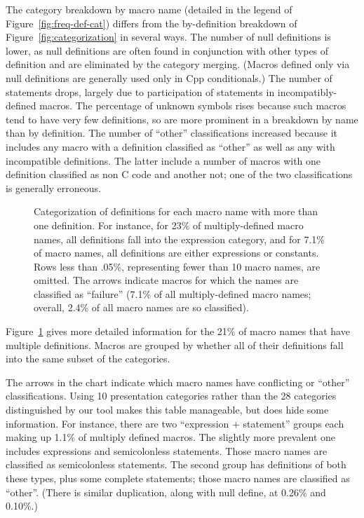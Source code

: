 \documentclass[10pt]{article}
\newcommand{\captionsmall}[1]{\caption[]{\small #1}}
\begin{document}
The category breakdown by macro name (detailed in the legend of
Figure~\ref{fig:freq-def-cat}) differs from the by-definition breakdown of
Figure~\ref{fig:categorization} in several ways.  The number of null
definitions is lower, as null definitions are often found in conjunction
with other types of definition and are eliminated by the category merging.
(Macros defined only via null definitions are generally used only in Cpp
conditionals.)  The number of statements drops, largely due to
participation of statements in incompatibly-defined macros.  The percentage
of unknown symbols rises because such macros tend to have very few
definitions, so are more prominent in a breakdown by name than by
definition.  The number of ``other'' classifications increased because it
includes any macro with a definition classified as ``other'' as well as any
with incompatible definitions.  The latter include a number of macros with
one definition classified as non C code and another not; one of the two
classifications is generally erroneous.


\begin{figure}
  {\small\centerline{}}
  
  \captionsmall{Categorization of definitions for each macro name with more
    than one definition.  For instance, for 23\% of multiply-defined macro
    names, all definitions fall into the expression category, and for 7.1\%
    of macro names, all definitions are either expressions or constants.
    Rows less than .05\%, representing fewer than
    10 macro names, are omitted.  The arrows indicate macros for which the
    names are classified as ``failure'' (7.1\% of all multiply-defined
    macro names; overall, 2.4\% of all macro names are so classified).}

  \label{fig:subset-categories}
\end{figure}

Figure~\ref{fig:subset-categories} gives more detailed information for the
21\% of macro names that have multiple definitions.  Macros are grouped by
whether all of their definitions fall into the same subset of the
categories.

The arrows in the chart indicate which macro names have conflicting or
``other'' classifications.  Using 10 presentation categories rather than
the 28 categories distinguished by our tool makes this table manageable,
but does hide some information.  For instance, there are two ``expression +
statement'' groups each making up 1.1\% of multiply defined macros.  The
slightly more prevalent one includes expressions and semicolonless
statements.  Those macro names are classified as semicolonless statements.
The second group has definitions of both these types, plus some complete
statements; those macro names are classified as ``other''.  (There is
similar duplication, along with null define, at 0.26\% and 0.10\%.)
\end{document}
